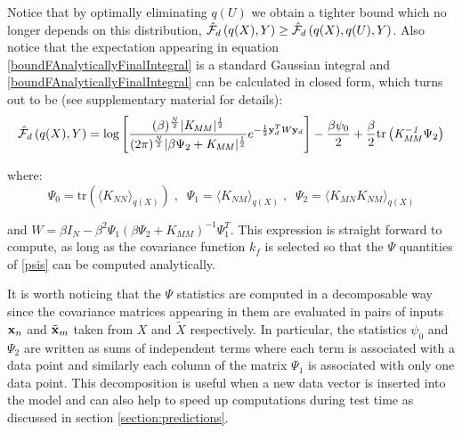 \noindent Notice that by optimally eliminating $q(U)$ we obtain a tighter bound which no longer depends on
this distribution, \ie $\hat{\mathcal{F}}_d \left( q(X), Y \right) \geq \hat{\mathcal{F}}_d \left( q(X), q(U), Y \right)$.
Also notice that the expectation appearing in equation \eqref{boundFAnalyticallyFinalIntegral}
is a standard Gaussian integral and \eqref{boundFAnalyticallyFinalIntegral} can
be calculated in closed form, which turns out to be (see supplementary material for details):
\begin{equation}
\label{FdFinal}
\hat{\mathcal{F}}_d \left( q(X), Y \right) = \log \left[   
	\frac{(\beta)^{\frac{N}{2}} \vert \mathit{K_{MM}} \vert ^\frac{1}{2} }
		 {(2\pi)^{\frac{N}{2}} \vert \beta \Psi_2 + \mathit{K_{MM}}  \vert ^\frac{1}{2} } 
	 e^{-\frac{1}{2} \mathbf{y}^{T}_{d} W \mathbf{y}_d}
	 \right]	 -
	 \frac{\beta \psi_0}{2} + \frac{\beta}{2} 
	 \text{tr} \left( \mathit{K_{MM}^{-1}} \Psi_2 \right)	
\end{equation}

\noindent where:
\begin{equation}
\label{psis}
\Psi_0 = \text{tr}(\langle \mathit{K_{NN}} \rangle_{q(\mathit{X})}) \;, \;\;
\Psi_1 = \langle \mathit{K_{NM}} \rangle_{q(\mathit{X})} \;, \;\;
\Psi_2 = \langle \mathit{K_{MN}} \mathit{K_{NM}} \rangle_{q(\mathit{X})}
\end{equation}

\noindent and $W = \beta I_N - \beta^2 \Psi_1 (\beta \Psi_2 + K_{MM})^{-1} \Psi_1^T$. This expression is straight forward to compute, as long as the covariance function $k_f$
 is selected so that the $\Psi$ quantities of \eqref{psis} can be computed analytically. 

It is worth noticing that the $\Psi$ statistics are computed in a decomposable way 
since the covariance matrices appearing in them are evaluated in pairs of
inputs $\mathbf{x}_n$ and $\tilde{\mathbf{x}}_m$ taken from $X$ and $\tilde{X}$ respectively.
 In particular, the statistics 
$\psi_0$ and $\Psi_2$ are written as sums of independent terms
where each term is associated with a data point and similarly 
each column of the matrix $\Psi_1$ is associated with only one data point.
This decomposition is useful when a new data vector %
is inserted into the model and can also help to speed up computations during
test time as discussed in section \ref{section:predictions}. 


